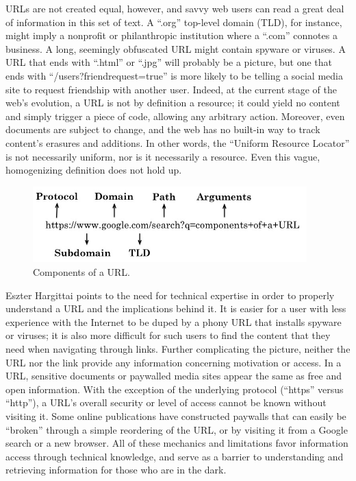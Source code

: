 URLs are not created equal, however, and savvy web users can read a great deal of information in this set of text. A ``.org'' top-level domain (TLD), for instance, might imply a nonprofit or philanthropic institution where a ``.com'' connotes a business. A long, seemingly obfuscated URL might contain spyware or viruses. A URL that ends with ``.html'' or ``.jpg'' will probably be a picture, but one that ends with ``/users?friendrequest=true'' is more likely to be telling a social media site to request friendship with another user. Indeed, at the current stage of the web's evolution, a URL is not by definition a resource; it could yield no content and simply trigger a piece of code, allowing any arbitrary action. Moreover, even documents are subject to change, and the web has no built-in way to track content's erasures and additions. In other words, the ``Uniform Resource Locator'' is not necessarily uniform, nor is it necessarily a resource. Even this vague, homogenizing definition does not hold up.

\begin{figure}[ht]
\centering
\includegraphics[width=300pt]{figures/annotatedurl}
\caption{Components of a URL.}
\label{fig:annotatedurl}
\end{figure}

Eszter Hargittai points to the need for technical expertise in order to properly understand a URL and the implications behind it.\autocite{hargittai_role_2008} It is easier for a user with less experience with the Internet to be duped by a phony URL that installs spyware or viruses; it is also more difficult for such users to find the content that they need when navigating through links. Further complicating the picture, neither the URL nor the link provide any information concerning motivation or access. In a URL, sensitive documents or paywalled media sites appear the same as free and open information. With the exception of the underlying protocol (``https'' versus ``http''), a URL's overall security or level of access cannot be known without visiting it. Some online publications have constructed paywalls that can easily be ``broken'' through a simple reordering of the URL, or by visiting it from a Google search or a new browser.\autocites[See, e.g.,][]{benton_that_2011}{smith_iv_heres_2015} All of these mechanics and limitations favor information access through technical knowledge, and serve as a barrier to understanding and retrieving information for those who are in the dark.

